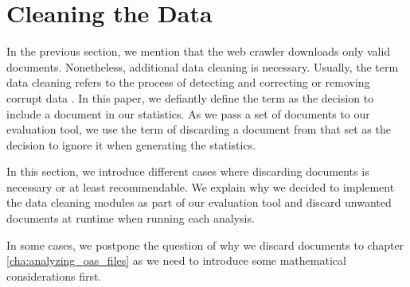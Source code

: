 \section{Cleaning the Data}
\label{sec:cleaning_data}
In the previous section, we mention that the web crawler downloads only valid documents. Nonetheless, additional data cleaning is necessary. Usually, the term data cleaning refers to the process of detecting and correcting or removing corrupt data \cite{data_cleaning}. In this paper, we defiantly define the term as the decision to include a document in our statistics. As we pass a set of documents to our evaluation tool, we use the term of discarding a document from that set as the decision to ignore it when generating the statistics.

In this section, we introduce different cases where discarding documents is necessary or at least recommendable. We explain why we decided to implement the data cleaning modules as part of our evaluation tool and discard unwanted documents at runtime when running each analysis.

In some cases, we postpone the question of why we discard documents to chapter \ref{cha:analyzing_oas_files} as we need to introduce some mathematical considerations first.